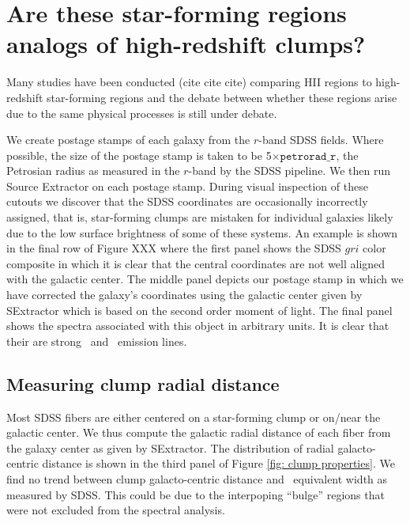 \section{Are these star-forming regions analogs of high-redshift clumps?}
Many studies have been conducted (cite cite cite) comparing HII regions to high-redshift star-forming regions and the debate between whether these regions arise due to the same physical processes is still under debate. 

We create postage stamps of each galaxy from the $r$-band SDSS fields.  Where possible, the size of the postage stamp is taken to be 5$\times\mathtt{petrorad\_r}$, the Petrosian radius as measured in the $r$-band by the SDSS pipeline. We then run Source Extractor \citep{sextractor} on each postage stamp. During visual inspection of these cutouts we discover that the SDSS coordinates are occasionally incorrectly assigned, that is, star-forming clumps are mistaken for individual galaxies likely due to the low surface brightness of some of these systems. An example is shown in the final row of Figure XXX where the first panel shows the SDSS $gri$ color composite in which it is clear that the central coordinates are not well aligned with the galactic center. The middle panel depicts our postage stamp in which we have corrected the galaxy's coordinates using the galactic center given by SExtractor which is based on the second order moment of light. The final panel shows the spectra associated with this object in arbitrary units. It is clear that their are strong \ha~and \oiii~emission lines. 






\subsection{Measuring clump radial distance} \label{subsec:radii}
Most SDSS fibers are either centered on a star-forming clump or on/near the galactic center. We thus compute the galactic radial distance of each fiber from the galaxy center as given by SExtractor. The distribution of radial galacto-centric distance is shown in the third panel of Figure \ref{fig: clump properties}. We find no trend between clump galacto-centric distance and \ha~equivalent width as measured by SDSS. This could be due to the interpoping ``bulge'' regions that were not excluded from the spectral analysis. 

